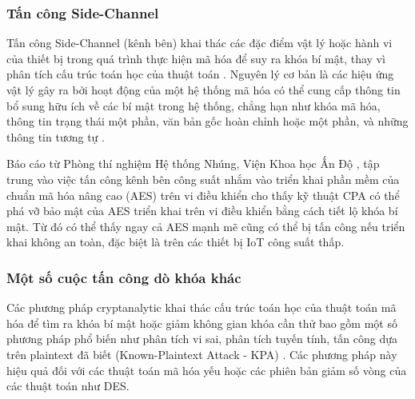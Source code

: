 \subsubsection{Tấn công Side-Channel}
Tấn công Side-Channel (kênh bên) khai thác các đặc điểm vật lý hoặc hành vi của thiết bị trong quá trình thực hiện mã hóa để suy ra khóa bí mật, thay vì phân tích cấu trúc toán học của thuật toán \cite{side-channel}. Nguyên lý cơ bản là các hiệu ứng vật lý gây ra bởi hoạt động của một hệ thống mã hóa có thể cung cấp thông tin bổ sung hữu ích về các bí mật trong hệ thống, chẳng hạn như khóa mã hóa, thông tin trạng thái một phần, văn bản gốc hoàn chỉnh hoặc một phần, và những thông tin tương tự \cite{side-channel}.


Báo cáo từ Phòng thí nghiệm Hệ thống Nhúng, Viện Khoa học Ấn Độ , tập trung vào việc tấn công kênh bên công suất nhắm vào triển khai phần mềm của chuẩn mã hóa nâng cao (AES) trên vi điều khiển \cite{cpa} cho thấy kỹ thuật CPA có thể phá vỡ bảo mật của AES triển khai trên vi điều khiển bằng cách tiết lộ khóa bí mật. Từ đó có thể thấy ngay cả AES mạnh mẽ cũng có thể bị tấn công nếu triển khai không an toàn, đặc biệt là trên các thiết bị IoT công suất thấp.

\subsubsection{Một số cuộc tấn công dò khóa khác}
Các phương pháp cryptanalytic khai thác cấu trúc toán học của thuật toán mã hóa để tìm ra khóa bí mật hoặc giảm không gian khóa cần thử bao gồm một số phương pháp phổ biến như phân tích vi sai, phân tích tuyến tính, tấn công dựa trên plaintext đã biết (Known-Plaintext Attack - KPA) \cite{cryptanalytic}. Các phương pháp này hiệu quả đối với các thuật toán mã hóa yếu hoặc các phiên bản giảm số vòng của các thuật toán như DES. 

